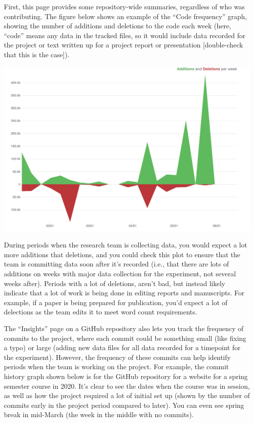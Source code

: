 \documentclass[]{tufte-book}
\begin{document}
First, this page provides some repository-wide summaries, regardless of who was
contributing. The figure below shows an example of the ``Code frequency'' graph,
showing the number of additions and deletions to the code each week (here, ``code'' means
any data in the tracked files, so it would include data recorded for the project or
text written up for a project report or presentation {[}double-check that this is the
case{]}).

\includegraphics[width=24in]{figures/github_code_frequency}

During periods when the research team is collecting data, you would expect
a lot more additions that deletions, and you could check this plot to ensure that the
team is committing data soon after it's recorded (i.e., that there are lots of additions
on weeks with major data collection for the experiment, not several weeks after).
Periods with a lot of deletions, aren't bad, but instead likely indicate that a lot of
work is being done in editing reports and manuscripts. For example, if a paper is being
prepared for publication, you'd expect a lot of delections as the team edits it to meet
word count requirements.

The ``Insights'' page on a GitHub repository also lets you track the frequency of commits
to the project, where each commit could be something small (like fixing a typo) or
large (adding new data files for all data recorded for a timepoint for the experiment).
However, the frequency of these commits can help identify periods when the team is working
on the project. For example, the commit history graph shown below is for the GitHub
repository for a website for a spring semester course in 2020. It's clear to see the
dates when the course was in session, as well as how the project required a lot of
initial set up (shown by the number of commits early in the project period compared
to later). You can even see spring break in mid-March (the week in the middle with no
commits).
\end{document}
